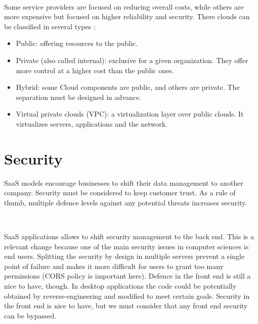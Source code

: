 \documentclass[12pt,english]{article} %
\begin{document}
\

Some service providers are focused on reducing overall costs, while others are more expensive but focused on higher reliability and security.
There clouds can be classified in several types \cite{cloud-computing-state-of-the-art}:
\begin{itemize}
    \item Public: offering resources to the public.
    \item Private (also called internal): exclusive for a given organization. They offer more control at a higher cost than the public ones.
    \item Hybrid: some Cloud components are public, and others are private. The separation must be designed in advance.
    \item Virtual private clouds (VPC): a virtualization layer over public clouds.
    It virtualizes servers, applications and the network.
\end{itemize}



\newpage



\section{Security}
SaaS models encourage businesses to shift their data management to another company.
Security must be considered to keep customer trust. 
As a rule of thumb, multiple defence levels against any potential threats increases security.

\

SaaS applications allows to shift security management to the back end.
This is a relevant change because one of the main security issues in computer sciences is end users.
Splitting the security by design in multiple servers prevent a single point of failure and makes it more difficult for users to grant too many permissions (CORS policy is important here).
Defence in the front end is still a nice to have, though.
In desktop applications the code could be potentially obtained by reverse-engineering and modified to meet certain goals. %
Security in the front end is nice to have, but we must consider that any front end security can be bypassed.

\
\end{document}
